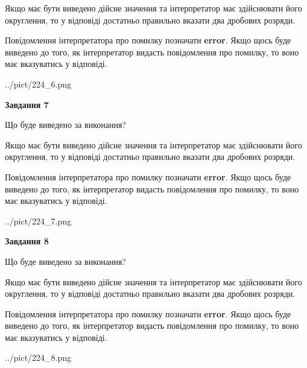 \documentclass[12pt, ukrainian]{article}
\begin{document}
{\begin {Large}
Якщо має бути виведено дійсне значення та інтерпретатор має здійснювати його округлення, 
то у відповіді достатньо правильно вказати два дробових розряди.

Повідомлення інтерпретатора про помилку позначати \textbf{error}.
Якщо щось буде виведено до того, як інтерпретатор видасть повідомлення про помилку, 
то воно має вказуватись у відповіді. \par

\begin{center}
	{../pict/224_6.png}
\end{center}
\newpage

{\begin {center}\textbf{Завдання 7}\end {center}}\par
Що буде виведено за виконання? \par

Якщо має бути виведено дійсне значення та інтерпретатор має здійснювати його округлення, 
то у відповіді достатньо правильно вказати два дробових розряди.

Повідомлення інтерпретатора про помилку позначати \textbf{error}.
Якщо щось буде виведено до того, як інтерпретатор видасть повідомлення про помилку, 
то воно має вказуватись у відповіді. \par

\begin{center}
	{../pict/224_7.png}
\end{center}
\newpage

{\begin {center}\textbf{Завдання 8}\end {center}}\par
Що буде виведено за виконання? \par

Якщо має бути виведено дійсне значення та інтерпретатор має здійснювати його округлення, 
то у відповіді достатньо правильно вказати два дробових розряди.

Повідомлення інтерпретатора про помилку позначати \textbf{error}.
Якщо щось буде виведено до того, як інтерпретатор видасть повідомлення про помилку, 
то воно має вказуватись у відповіді. \par

\begin{center}
	{../pict/224_8.png}
\end{center}
\newpage


\end{Large}}
\end{document}
